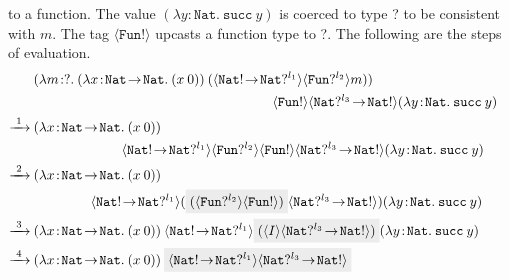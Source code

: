 to a function. The value $(\lambda y \! : \! \texttt{Nat} . \: \texttt{succ} \: y)$ is coerced to type ? to 
be consistent with $m$. The tag $\langle \texttt{Fun}! \rangle$ upcasts a function type to ?.
The following are the steps of evaluation.
\begin{align*}
    & (\lambda m \! :? . \: (\lambda x \! : \! \texttt{Nat} \! \rightarrow \! \texttt{Nat} . \: 
    (x \: 0)) \: (\langle \texttt{Nat}! \! \rightarrow \! \texttt{Nat}? ^{l_1} \rangle \langle \texttt{Fun}? ^{l_2} \rangle m)) & \\
    & \hspace{6.1cm} \: \langle \texttt{Fun}! \rangle \langle \texttt{Nat}? ^{l_3} \! \rightarrow \! \texttt{Nat}! \rangle 
    (\lambda y \! : \! \texttt{Nat} . \: \texttt{succ} \: y) \\
    \xrightarrow{\text{ 1 }} \:
    &  (\lambda x \! : \! \texttt{Nat} \! \rightarrow \! \texttt{Nat} . \: 
    (x \: 0)) & \\ 
    & \hspace{2.2cm} \: \langle \texttt{Nat}! \! \rightarrow \! \texttt{Nat}? ^{l_1} \rangle \langle \texttt{Fun}? ^{l_2} \rangle 
    \langle \texttt{Fun}! \rangle \langle \texttt{Nat}? ^{l_3} \! \rightarrow \! \texttt{Nat}! \rangle 
    (\lambda y \! : \! \texttt{Nat} . \: \texttt{succ} \: y) \\
    \xrightarrow{\text{ 2 }} \:    
    & (\lambda x \! : \! \texttt{Nat} \! \rightarrow \! \texttt{Nat} . \: 
    (x \: 0)) & \\ 
    & \hspace{1.4cm} \: \langle \texttt{Nat}! \! \rightarrow \! \texttt{Nat}? ^{l_1} \rangle (\highlight{(\langle \texttt{Fun}? ^{l_2} \rangle 
    \langle \texttt{Fun}! \rangle)} \langle \texttt{Nat}? ^{l_3} \! \rightarrow \! \texttt{Nat}! \rangle) 
    (\lambda y \! : \! \texttt{Nat} . \: \texttt{succ} \: y) \\
    \xrightarrow{\text{ 3 }} \:
    & (\lambda x \! : \! \texttt{Nat} \! \rightarrow \! \texttt{Nat} . \: 
    (x \: 0)) \: \langle \texttt{Nat}! \! \rightarrow \! \texttt{Nat}? ^{l_1} \rangle \highlight{(\langle I \rangle
     \langle \texttt{Nat}? ^{l_3} \! \rightarrow \! \texttt{Nat}! \rangle)} 
    (\lambda y \! : \! \texttt{Nat} . \: \texttt{succ} \: y) \\
    \xrightarrow{\text{ 4 }} \:
    & (\lambda x \! : \! \texttt{Nat} \! \rightarrow \! \texttt{Nat} . \: 
    (x \: 0)) \: \highlight{\langle \texttt{Nat}! \! \rightarrow \! \texttt{Nat}? ^{l_1} \rangle 
     \langle \texttt{Nat}? ^{l_3} \! \rightarrow \! \texttt{Nat}! \rangle}

\end{align*}
